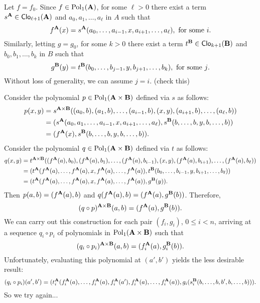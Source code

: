 Let $f = f_0$.  Since $f\in \operatorname{Pol}_1(\mathbf{A})$, for some $\ell>0$ there
exist a term $s^{\mathbf{A}} \in \operatorname{\mathsf{Clo}}_{\ell+1}(\mathbf{A})$ and $a_0, a_1, \dots, a_\ell$ in $A$ such that
\[
f^{\mathbf{A}}(x) = s^{\mathbf{A}}(a_0, \dots, a_{i-1}, x, a_{i+1}, \dots, a_\ell), \text{ for some $i$.}
\]
Similarly, letting $g = g_0$, for some $k>0$ there
exist a term $t^{\mathbf{B}} \in \operatorname{\mathsf{Clo}}_{k+1}(\mathbf{B})$ and $b_0, b_1, \dots, b_k$ in $B$ such that
\[
g^{\mathbf{B}}(y) = t^{\mathbf{B}}(b_0, \dots, b_{j-1}, y, b_{j+1}, \dots, b_k), \text{ for some $j$.}
\]
Without loss of generality, we can assume $j=i$. (check this)

Consider the polynomial $p \in \operatorname{Pol}_1(\mathbf{A}\times \mathbf{B})$ defined via
$s$ as follows:
\begin{align*}
p(x,y) &= s^{\mathbf{A} \times \mathbf{B}}((a_0, b), (a_1, b), \dots, (a_{i-1}, b),(x,y),
(a_{i+1}, b), \dots, (a_{\ell}, b))\\
&= (s^{\mathbf{A}} (a_0, a_1,\dots, a_{i-1}, x, a_{i+1}, \dots, a_{\ell}), 
s^{\mathbf{B}}(b, \dots, b, y, b,\dots, b))\\
&= (f^{\mathbf{A}} (x), 
s^{\mathbf{B}}(b, \dots, b, y, b,\dots, b)).
\end{align*}
Consider the polynomial $q \in \operatorname{Pol}_1(\mathbf{A}\times \mathbf{B})$ defined via
$t$ as follows:
\begin{align*}
q(x,y) &= t^{\mathbf{A} \times \mathbf{B}}((f^{\mathbf{A}}(a), b_0), (f^{\mathbf{A}}(a), b_1), \dots, (f^{\mathbf{A}}(a), b_{i-1}),(x,y),
(f^{\mathbf{A}}(a), b_{i+1}), \dots, (f^{\mathbf{A}}(a), b_{\ell}))\\
&= (t^{\mathbf{A}} (f^{\mathbf{A}}(a), \dots, f^{\mathbf{A}}(a), x, f^{\mathbf{A}}(a), \dots, f^{\mathbf{A}}(a)), 
t^{\mathbf{B}}(b_0, \dots, b_{i-1}, y, b_{i+1},\dots, b_{\ell}))\\
&= (t^{\mathbf{A}} (f^{\mathbf{A}}(a), \dots, f^{\mathbf{A}}(a), x, f^{\mathbf{A}}(a), \dots, f^{\mathbf{A}}(a)), 
g^{\mathbf{B}}(y)).
\end{align*}
Then $p(a,b) = (f^{\mathbf{A}}(a), b)$ and $q(f^{\mathbf{A}}(a), b) = (f^{\mathbf{A}}(a),g^{\mathbf{B}}(b))$.
Therefore,
\[
(q\circ p)^{\mathbf{A}\times \mathbf{B}} (a,b) =
(f^{\mathbf{A}} (a), g^{\mathbf{B}} (b)).
\]
We can carry out this construction for each pair $(f_i, g_i)$, $0\leq i < n$,
arriving at a sequence $q_i \circ p_i$ of polynomials in
$\operatorname{Pol}_1(\mathbf{A} \times \mathbf{B})$ such that
\[
(q_i\circ p_i)^{\mathbf{A}\times \mathbf{B}} (a,b) =
(f_i^{\mathbf{A}} (a), g_i^{\mathbf{B}} (b)).
\]
Unfortunately, evaluating this polynomial at $(a',b')$ yields the less
desirable result:
\[
(q_i\circ p_i)(a',b')=
(t_i^{\mathbf{A}}(f_i^{\mathbf{A}} (a), \dots, f_i^{\mathbf{A}} (a), f_i^{\mathbf{A}} (a'),f_i^{\mathbf{A}} (a), \dots, f_i^{\mathbf{A}} (a)),
g_i(s_i^{\mathbf{B}}(b, \dots, b, b', b,\dots, b))).
\]
So we try again...


